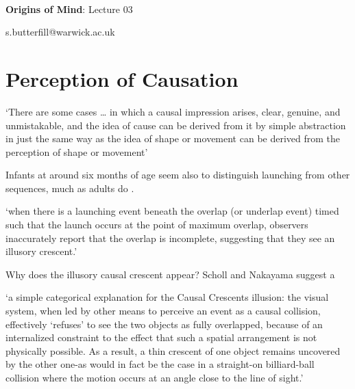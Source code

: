 \documentclass[12pt]{extarticle}
\date{}
\makeatletter
\def \ititle {Origins of Mind}
\def \isubtitle {Lecture 02}
\def \iemail{s.butterfill@warwick.ac.uk}
\makeatother
\begin{document}
\begin{multicols}{3}

\setlength\footnotesep{1em}







\def \ititle {Origins of Mind}
 
\def \isubtitle {Lecture 03}
 
 
 
\
 
 
 
\begin{center}
 
{\Large
 
\textbf{\ititle}: \isubtitle
 
}
 
 
 
\iemail %
 
\end{center}
 
 
 
\section{Perception of Causation}
 
‘There are some cases … in which a causal impression arises, clear, genuine, and unmistakable, and the idea of cause can be derived from it by simple abstraction in just the same way as the idea of shape or movement can be derived from the perception of shape or movement’
\citep[p.\ 270--1]{Michotte:1946nz}
 
Infants at around six months of age seem also to distinguish launching from other sequences, much as adults do \citep{Leslie:1987nr}.
 
‘when there is a launching event beneath the overlap (or underlap event) timed such that the launch occurs at the point of maximum overlap, observers inaccurately report that the overlap is incomplete, suggesting that they see an illusory crescent.’
\citep[p.\ 461]{Scholl:2004dx}
 
Why does the illusory causal crescent appear? Scholl and Nakayama suggest a
 
‘a simple categorical explanation for the Causal Crescents illusion: the visual system, when led by other means to perceive an event as a causal collision, effectively ‘refuses’ to see the two objects as fully overlapped, because of an internalized constraint to the effect that such a spatial arrangement is not physically possible. As a result, a thin crescent of one object remains uncovered by the other one-as would in fact be the case in a straight-on billiard-ball collision where the motion occurs at an angle close to the line of sight.’
\citep[p.\ 466]{Scholl:2004dx}
 

\end{multicols}
\end{document}
